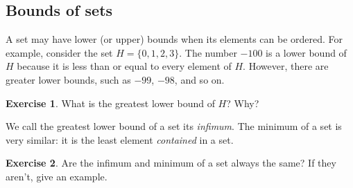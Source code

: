 \documentclass{book}
\theoremstyle{definition}
\newtheorem{exercise}{Exercise}[chapter]
\theoremstyle{colonstylebf}
\newcommand{\set}[1]{\{#1\}}
\begin{document}


\subsection{Bounds of sets}
A set may have lower (or upper) bounds when its elements can be ordered. For example, consider the set $H = \set{0, 1, 2, 3}$. The number $-100$ is a lower bound of $H$ because it is less than or equal to every element of $H$. However, there are greater lower bounds, such as $-99$, $-98$, and so on.
\begin{exercise}\label{lowerbound}
What is the greatest lower bound of $H$? Why?
\end{exercise}
We call the greatest lower bound of a set its \textit{infimum}. The minimum of a set is very similar: it is the least element \emph{contained} in a set.
\begin{exercise}\label{reallower}
Are the infimum and minimum of a set always the same? If they aren't, give an example.
\end{exercise}
\end{document}
